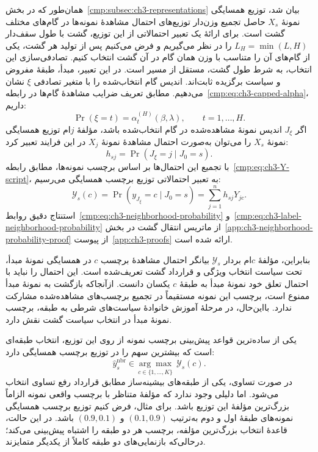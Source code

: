 همان‌طور که در بخش~\ref{cmp:subsec:ch3-representations} بیان شد،
توزیع همسایگی نمونهٔ $X_s$ حاصل تجمیع وزن‌دار توزیع‌های احتمال
مشاهدهٔ نمونه‌ها در گام‌های مختلف گشت است.
برای ارائهٔ یک تعبیر احتمالاتی از این توزیع، گشت با طول سقف‌دار
$L_H=\min(L,H)$ را در نظر می‌گیریم و فرض می‌کنیم پس از تولید
هر گشت، یکی از گام‌های آن را متناسب با وزن همان گام در آن گشت
انتخاب کنیم. تصادفی‌سازی این انتخاب، به شرط طول گشت،
مستقل از مسیر است. در این تعبیر، مبدأ، طبقهٔ مفروض و سیاست
برگزیده ثابت‌اند. اندیس گام انتخاب‌شده را با متغیر تصادفی $\xi$ نشان می‌دهیم.
مطابق تعریف ضرایب مشاهدهٔ گام‌ها در رابطه~\eqref{cmp:eq:ch3-capped-alpha}، داریم:
\begin{equation}\label{cmp:eq:ch3-weighted-observation-position}
\Pr(\xi=t)=\alpha_t^{(H)}(\beta,\lambda),
\qquad t=1,\ldots,H.
\end{equation}
اگر $J_\xi$ اندیس نمونهٔ مشاهده‌شده در گام انتخاب‌شده باشد،
مؤلفهٔ $j$ام توزیع همسایگی نمونهٔ $X_s$ را می‌توان به‌صورت
احتمال مشاهدهٔ نمونهٔ $X_j$ در این فرایند تعبیر کرد:
\begin{equation}\label{cmp:eq:ch3-neighborhood-probability}
h_{sj}=\Pr(J_\xi=j\mid J_0=s).
\end{equation}
با تجمیع این احتمال‌ها بر اساس برچسب نمونه‌ها، مطابق
رابطه~\eqref{cmp:eq:ch3-Y-script}، به تعبیر احتمالاتی
توزیع برچسب همسایگی می‌رسیم:
\begin{equation}\label{cmp:eq:ch3-label-neighborhood-probability}
\boxed{
\mathscr Y_s(c)=\Pr(y_{J_\xi}=c\mid J_0=s)
=\sum_{j=1}^{n}h_{sj}Y_{jc}.
}
\end{equation}
استنتاج دقیق روابط~\eqref{cmp:eq:ch3-neighborhood-probability}
و~\eqref{cmp:eq:ch3-label-neighborhood-probability}
از ماتریس انتقال گشت در بخش~\ref{app:ch3-neighborhood-probability-proof}
از پیوست~\ref{app:ch3-proofs} ارائه شده است.

بنابراین، مؤلفهٔ $c$ام بردار $\mathscr Y_s$ بیانگر احتمال
مشاهدهٔ برچسب $c$ در همسایگی نمونهٔ مبدأ، تحت سیاست انتخاب
ویژگی و قرارداد گشت تعریف‌شده است. این احتمال را نباید
با احتمال تعلق خود نمونهٔ مبدأ به طبقهٔ $c$ یکسان دانست.
ازآنجاکه بازگشت به نمونهٔ مبدأ ممنوع است، برچسب این نمونه
مستقیماً در تجمیع برچسب‌های مشاهده‌شده مشارکت ندارد.
بااین‌حال، در مرحلهٔ آموزش خانوادهٔ سیاست‌های شرطی به طبقه،
برچسب نمونهٔ مبدأ در انتخاب سیاست گشت نقش دارد.

یکی از ساده‌ترین قواعد پیش‌بینی برچسب نمونه از روی این توزیع،
انتخاب طبقه‌ای است که بیشترین سهم را در توزیع برچسب همسایگی دارد:
\begin{equation}\label{cmp:eq:ch3-simple-label-decision}
\widehat y_s^{\mathrm{nbr}}
\in\underset{c\in\{1,\ldots,K\}}{\arg\max}\;\mathscr Y_s(c).
\end{equation}
در صورت تساوی، یکی از طبقه‌های بیشینه‌ساز مطابق قرارداد رفع
تساوی انتخاب می‌شود. اما دلیلی وجود ندارد که مؤلفهٔ متناظر
با برچسب واقعی نمونه الزاماً بزرگ‌ترین مؤلفهٔ این توزیع باشد.
برای مثال، فرض کنیم توزیع برچسب همسایگی نمونه‌های طبقهٔ اول
و دوم به‌ترتیب $(0.1,0.9)$ و $(0.9,0.1)$ باشد.
در این حالت، قاعدهٔ انتخاب بزرگ‌ترین مؤلفه، برچسب هر دو
طبقه را اشتباه پیش‌بینی می‌کند؛ درحالی‌که بازنمایی‌های دو
طبقه کاملاً از یکدیگر متمایزند.


